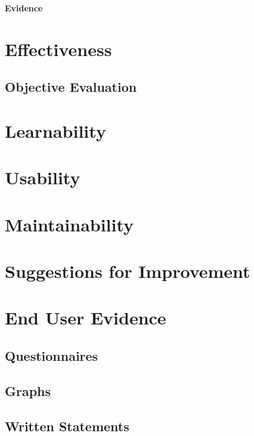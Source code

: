 \textbf{Evidence} \newline




\section{Effectiveness}

\subsection{Objective Evaluation}

\section{Learnability}

\section{Usability}

\section{Maintainability}

\section{Suggestions for Improvement}

\section{End User Evidence}

\subsection{Questionnaires}

\subsection{Graphs}

\subsection{Written Statements}
